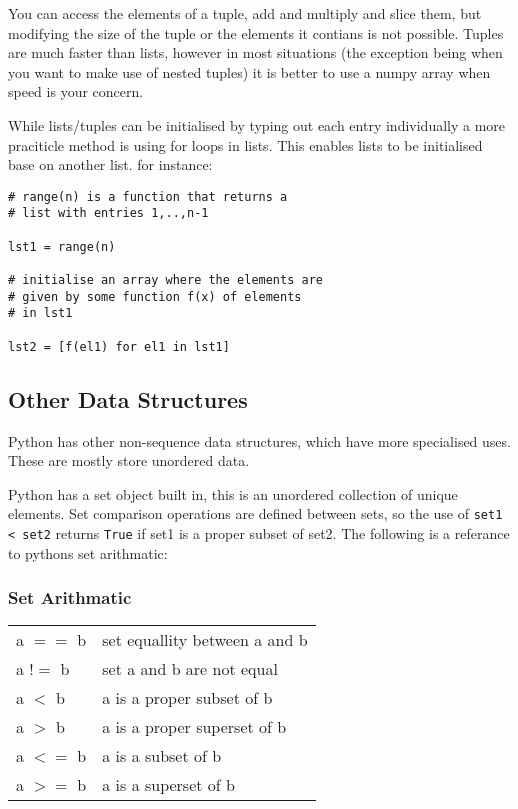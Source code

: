 \documentclass[11pt,a4paper]{article}
\begin{document}
You can access the elements of a tuple, add and multiply and slice them, but modifying the size of the tuple or the elements it contians is not possible. Tuples are much faster than lists, however in most situations (the exception being when you want to make use of nested tuples) it is better to use a numpy array when speed is your concern.


While lists/tuples can be initialised by typing out each entry individually a more praciticle method is using for loops in lists. This enables lists to be initialised base on another list. for instance:

\begin{verbatim}
# range(n) is a function that returns a
# list with entries 1,..,n-1

lst1 = range(n)

# initialise an array where the elements are
# given by some function f(x) of elements
# in lst1

lst2 = [f(el1) for el1 in lst1]

\end{verbatim}

\subsection{Other Data Structures}

Python has other non-sequence data structures, which have more specialised uses. These are mostly store unordered data. 

Python has a set object built in, this is an unordered collection of unique elements. Set comparison operations are defined between sets, so the use of \verb|set1 < set2| returns \verb|True| if set1 is a proper subset of set2. The following is a referance to pythons set arithmatic:

\subsubsection{Set Arithmatic}
\begin{center}
\begin{tabular}{l l}
a $==$ b & set equallity between a and b \\ 
a $!=$ b & set a and b are not equal\\
a $<$ b & a is a proper subset of b \\
a $>$ b & a is a proper superset of b \\
a $<=$ b & a is a subset of b\\
a $>=$ b & a is a superset of b \\
\end{tabular}
\end{center}
\end{document}
